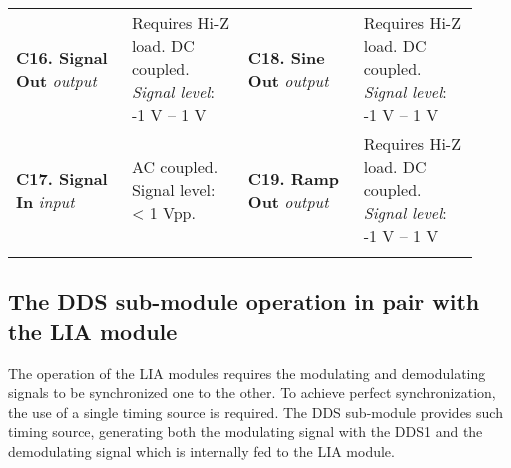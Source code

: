 \begin{table}[!h]
    \centering
    \begin{tabular}{ p{0.23\linewidth}  p{0.23\linewidth}  p{0.23\linewidth}  p{0.23\linewidth} }
    \hline
    \hline
    \addlinespace
        \textbf{C16. Signal Out}
        \newline \textit{output}
    &   
        {\footnotesize Requires Hi-Z load.
        \newline DC coupled.
        \newline \textit{Signal level}: \hspace*{\fill} -1 V – 1 V }
    &
         \textbf{C18. Sine Out}  
        \newline \textit{output}
    &   
        {\footnotesize Requires Hi-Z load.
        \newline DC coupled.
        \newline \textit{Signal level}: \hspace*{\fill} -1 V – 1 V }
    \\
    \addlinespace
        \textbf{C17. Signal In}
        \newline \textit{input}
    &
        {\footnotesize AC coupled.
        \newline Signal level: \hspace*{\fill} < 1 Vpp. }
    &
        \textbf{C19. Ramp Out}
        \newline \textit{output}
    &   
        {\footnotesize Requires Hi-Z load.
        \newline DC coupled.
        \newline \textit{Signal level}: \hspace*{\fill} -1 V – 1 V }
    \\
    \addlinespace
    \hline
    \hline
    \end{tabular}
\end{table}





\subsection{The DDS sub-module operation in pair with the LIA module} \label{cpt:LIA_rephasing}
The operation of the LIA modules requires the modulating and demodulating signals to be synchronized one to the other. To achieve perfect synchronization, the use of a single timing source is required. The DDS sub-module provides such timing source, generating both the modulating signal with the DDS1 and the demodulating signal which is internally fed to the LIA module.

